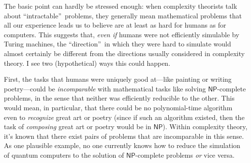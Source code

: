 \documentclass[12pt,onecolumn]{article}%
\begin{document}
The basic point can hardly be stressed enough: when complexity theorists talk
about \textquotedblleft intractable\textquotedblright\  problems, they
generally mean mathematical problems that all our experience leads us to
believe are at least as hard for humans as for computers. This suggests
that, \textit{even if} humans were not efficiently simulable by Turing
machines, the \textquotedblleft direction\textquotedblright\  in which they
were hard to simulate would almost certainly be different from the directions
usually considered in complexity theory. I see two (hypothetical) ways this
could happen.

First, the tasks that humans were uniquely good at---like painting or writing
poetry---could be \textit{incomparable} with mathematical tasks like solving
$\mathsf{NP}$-complete problems, in the sense that neither was efficiently
reducible to the other. This would mean, in particular, that there could be
no polynomial-time algorithm even to \textit{recognize} great art or poetry
(since if such an algorithm existed, then the task of \textit{composing} great
art or poetry would be in $\mathsf{NP}$). Within complexity theory, it's
known that there exist pairs of problems that are incomparable in this sense.
 As one plausible example, no one currently knows how to reduce the
simulation of quantum computers to the solution of $\mathsf{NP}$-complete
problems \textit{or} vice versa.
\end{document}
